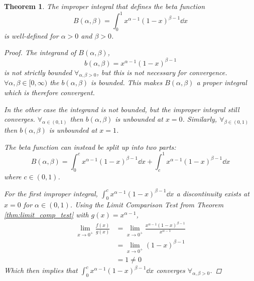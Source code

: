 \documentclass[]{article}
\newcommand{\R}{\mathbb{R}}
\newcommand{\st}{\ : \ }
\newtheorem{theorem}{Theorem}
\begin{document}

\begin{theorem}
    The improper integral that defines the beta function \[
        B(\alpha,\beta) = \int_0^1 x^{\alpha-1} (1-x)^{\beta-1} \dd{x}
    \] is well-defined for $\alpha > 0$ and $\beta > 0$. 
    \begin{proof}
        The integrand of $B(\alpha,\beta)$, \[
            b(\alpha,\beta) = x^{\alpha-1} (1-x)^{\beta - 1}
        \] is not strictly bounded $\forall_{\alpha,\beta>0}$, but this is not necessary for convergence. 
        $\forall{\alpha,\beta \in [0,\infty)}$ the $b(\alpha,\beta)$ is bounded. 
        This makes $B(\alpha,\beta)$ a proper integral which is therefore convergent.

        In the other case the integrand is not bounded, but the improper integral still converges. 
        $\forall_{\alpha \in (0,1)}$ then $b(\alpha,\beta)$ is unbounded at $x = 0$.
        Similarly, $\forall_{\beta \in (0,1)}$ then $b(\alpha,\beta)$ is unbounded at $x = 1$.        

        The beta function can instead be split up into two parts:\[
            B(\alpha,\beta) 
                = \int_{0}^{c} x^{\alpha-1} (1-x)^{\beta-1} \dd{x}
                + \int_{c}^{1} x^{\alpha-1} (1-x)^{\beta-1} \dd{x}
        \] where $c \in (0,1)$.

        For the first improper integral, $\int_{0}^{c} x^{\alpha-1} (1-x)^{\beta-1} \dd{x}$
        a discontinuity exists at $x = 0$ for $\alpha \in (0,1)$. 
        Using the Limit Comparison Test from Theorem \ref{thm:limit_comp_test} with $g(x) = x^{\alpha - 1}$, 
        \begin{align*}
            \lim_{x\to 0^{+}} \frac{f(x)}{g(x)} 
                &= \lim_{x\to 0^{+}} \frac{x^{\alpha-1} (1-x)^{\beta-1}}{x^{\alpha - 1}}\\
                &= \lim_{x\to 0^{+}} (1-x)^{\beta-1}\\
                &= 1 \neq 0
        \end{align*}
        Which then implies that $\int_{0}^{c} x^{\alpha-1} (1-x)^{\beta-1} \dd{x}$ 
        converges $\forall_{\alpha,\beta > 0}$.


\end{proof}
\end{theorem}
\end{document}
